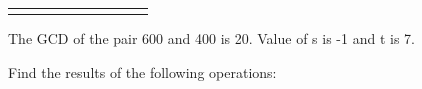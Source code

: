\documentclass[a4paper]{exam}
\begin{document}
\begin{questions}
\begin{solution}
\begin{table}[H]
\begin{center}
\begin{tabular}{cccccccccc}
                    \multicolumn{1}{l}{}                           & \multicolumn{1}{l}{}                & \multicolumn{1}{l}{}                & \multicolumn{1}{l}{}                          & \multicolumn{1}{l}{}                & \multicolumn{1}{l}{}                & \multicolumn{1}{l}{}                          & \multicolumn{1}{l}{}                & \multicolumn{1}{l}{}                & \multicolumn{1}{l}{}                          
                    \end{tabular}
                \end{center}
            \end{table}
            The GCD of the pair 600 and 400 is 20. Value of s is -1 and t is 7.
        \end{solution}

        \question[2 $\times$ 5 = 10]
        Find the results of the following operations:
        \begin{solution}
\end{solution}
\end{questions}
\end{document}

